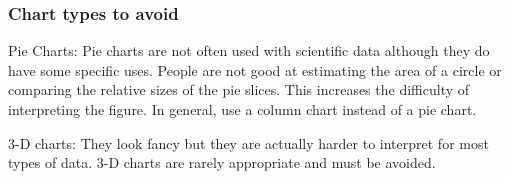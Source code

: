 \documentclass[12pt, hidelinks]{exam}
\begin{document}
\subsubsection*{Chart types to avoid}

Pie Charts: Pie charts are not often used with scientific data although they do have some specific uses. People are not good at estimating the area of a circle or comparing the relative sizes of the pie slices. This increases the difficulty of interpreting the figure. In general, use a column chart instead of a pie chart. 

3-D charts: They look fancy but they are actually harder to interpret for most types of data. 3-D charts are rarely appropriate and must be avoided. 
\end{document}
